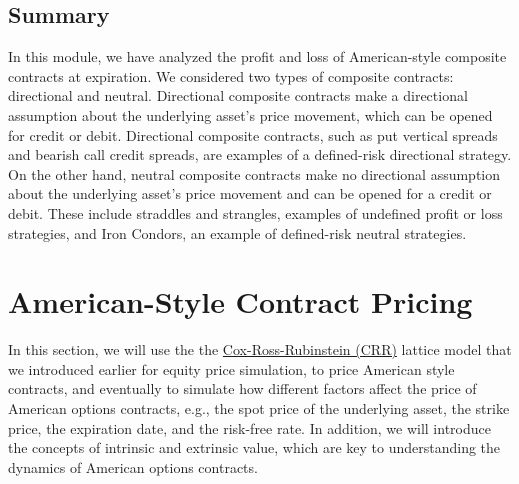 \documentclass[11pt]{article}
\theoremstyle{definition}
\begin{document}
\subsection{Summary}
In this module, we have analyzed the profit and loss of American-style composite contracts at expiration.
We considered two types of composite contracts: directional and neutral.
Directional composite contracts make a directional assumption about the underlying asset's price movement, which can be opened for credit or debit.
Directional composite contracts, such as put vertical spreads and bearish call credit spreads, are examples of a defined-risk directional strategy.
On the other hand, neutral composite contracts make no directional assumption about the underlying asset's price movement and can be opened for a credit or debit.
These include straddles and strangles, examples of undefined profit or loss strategies, and Iron Condors, an example of defined-risk neutral strategies.

\section{American-Style Contract Pricing}
In this section, we will use the the \href{https://en.wikipedia.org/wiki/Binomial_options_pricing_model}{Cox-Ross-Rubinstein (CRR)} 
lattice model that we introduced earlier for equity price simulation, to price American style contracts, and eventually to simulate how different factors affect the price of American options contracts, e.g., the 
spot price of the underlying asset, the strike price, the expiration date, and the risk-free rate.
In addition, we will introduce the concepts of intrinsic and extrinsic value, which are key to understanding
the dynamics of American options contracts. 
\end{document}
